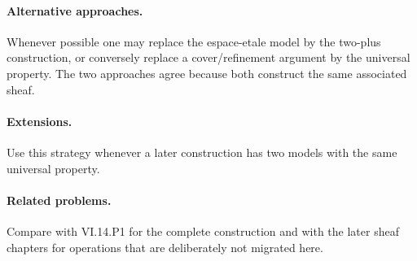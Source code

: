 \paragraph{Alternative approaches.}
Whenever possible one may replace the espace-etale model by the two-plus construction, or conversely replace a cover/refinement argument by the universal property.  The two approaches agree because both construct the same associated sheaf.

\paragraph{Extensions.}
Use this strategy whenever a later construction has two models with the same universal property.

\paragraph{Related problems.}
Compare with VI.14.P1 for the complete construction and with the later sheaf chapters for operations that are deliberately not migrated here.
\fi
